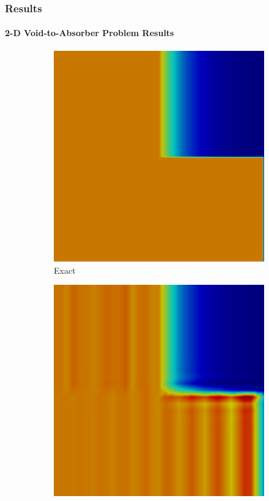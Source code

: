 \documentclass{beamer}
\begin{document}
\begin{frame}
\frametitle{Results}
\framesubtitle{2-D Void-to-Absorber Problem Results}

\begin{figure}[h]
   \centering
   \begin{subfigure}{0.3\textwidth}
      \includegraphics[width=\textwidth]{./figures/exact.png}
      \caption{Exact}
   \end{subfigure}
   \begin{subfigure}{0.3\textwidth}
      \includegraphics[width=\textwidth]{./figures/Gal.png}

\end{subfigure}
\end{figure}
\end{frame}
\end{document}
